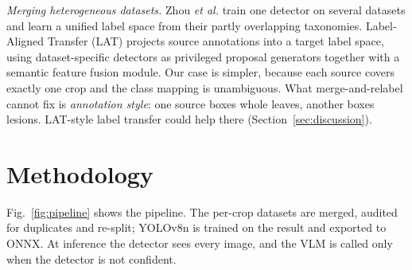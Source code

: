 \documentclass[conference]{IEEEtran}
\begin{document}
\textit{Merging heterogeneous datasets.} Zhou \textit{et al.} \cite{zhou2022unidet} train one detector on several datasets and learn a unified label space from their partly overlapping taxonomies. Label-Aligned Transfer (LAT) \cite{kennerley2026lat} projects source annotations into a target label space, using dataset-specific detectors as privileged proposal generators together with a semantic feature fusion module. Our case is simpler, because each source covers exactly one crop and the class mapping is unambiguous. What merge-and-relabel cannot fix is \emph{annotation style}: one source boxes whole leaves, another boxes lesions. LAT-style label transfer could help there (Section~\ref{sec:discussion}).

\section{Methodology}\label{sec:method}

Fig.~\ref{fig:pipeline} shows the pipeline. The per-crop datasets are merged, audited for duplicates and re-split; YOLOv8n is trained on the result and exported to ONNX. At inference the detector sees every image, and the VLM is called only when the detector is not confident.
\end{document}
